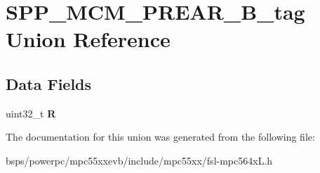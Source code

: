 \hypertarget{unionSPP__MCM__PREAR__32B__tag}{}\section{S\+P\+P\+\_\+\+M\+C\+M\+\_\+\+P\+R\+E\+A\+R\+\_\+B\+\_\+tag Union Reference}
\label{unionSPP__MCM__PREAR__32B__tag}
\subsection*{Data Fields}
\begin{DoxyCompactItemize}
\item 
\mbox{\label{unionSPP__MCM__PREAR__32B__tag_afdc046e2959a143fe9c787cab991a905}} 
uint32\+\_\+t {\bfseries R}
\end{DoxyCompactItemize}


The documentation for this union was generated from the following file\+:\begin{DoxyCompactItemize}
\item 
bsps/powerpc/mpc55xxevb/include/mpc55xx/fsl-\/mpc564x\+L.\+h\end{DoxyCompactItemize}
